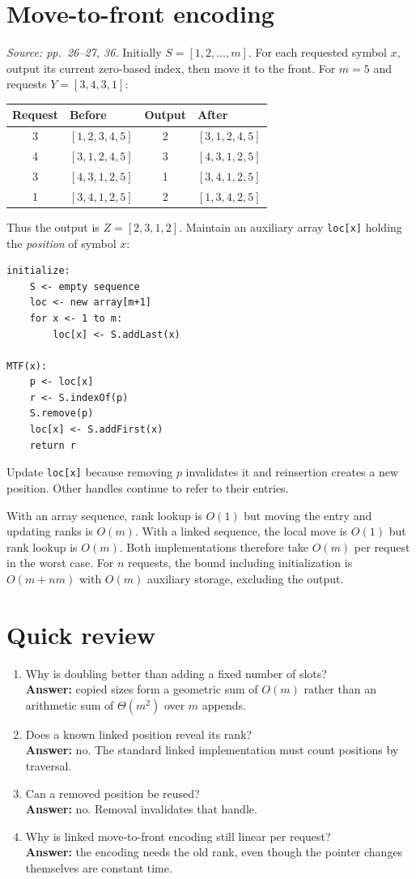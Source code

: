 \documentclass[11pt]{article}
\begin{document}
\section{Move-to-front encoding}
\textit{Source: pp.\ 26--27, 36.}
Initially $S=[1,2,\ldots,m]$. For each requested symbol $x$, output its current zero-based index, then move it to the front. For $m=5$ and requests $Y=[3,4,3,1]$:
\begin{center}
\begin{tabular}{clcl}
\toprule
Request & Before & Output & After\\
\midrule
3 & $[1,2,3,4,5]$ & 2 & $[3,1,2,4,5]$\\
4 & $[3,1,2,4,5]$ & 3 & $[4,3,1,2,5]$\\
3 & $[4,3,1,2,5]$ & 1 & $[3,4,1,2,5]$\\
1 & $[3,4,1,2,5]$ & 2 & $[1,3,4,2,5]$\\
\bottomrule
\end{tabular}
\end{center}
Thus the output is $Z=[2,3,1,2]$. Maintain an auxiliary array \texttt{loc[x]} holding the \emph{position} of symbol $x$:
\begin{lstlisting}
initialize:
    S <- empty sequence
    loc <- new array[m+1]
    for x <- 1 to m:
        loc[x] <- S.addLast(x)

MTF(x):
    p <- loc[x]
    r <- S.indexOf(p)
    S.remove(p)
    loc[x] <- S.addFirst(x)
    return r
\end{lstlisting}
Update \texttt{loc[x]} because removing $p$ invalidates it and reinsertion creates a new position. Other handles continue to refer to their entries.

With an array sequence, rank lookup is $O(1)$ but moving the entry and updating ranks is $O(m)$. With a linked sequence, the local move is $O(1)$ but rank lookup is $O(m)$. Both implementations therefore take $O(m)$ per request in the worst case. For $n$ requests, the bound including initialization is $O(m+nm)$ with $O(m)$ auxiliary storage, excluding the output.

\section{Quick review}
\begin{enumerate}
\item Why is doubling better than adding a fixed number of slots?\\
\textbf{Answer:} copied sizes form a geometric sum of $O(m)$ rather than an arithmetic sum of $\Theta(m^2)$ over $m$ appends.
\item Does a known linked position reveal its rank?\\
\textbf{Answer:} no. The standard linked implementation must count positions by traversal.
\item Can a removed position be reused?\\
\textbf{Answer:} no. Removal invalidates that handle.
\item Why is linked move-to-front encoding still linear per request?\\
\textbf{Answer:} the encoding needs the old rank, even though the pointer changes themselves are constant time.
\end{enumerate}
\end{document}
